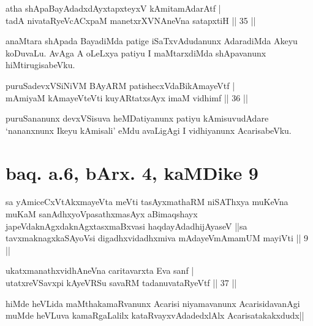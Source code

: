 \begin{shl}
atha shApaBayAdadxdAyxtapxteyxV kAmitamAdarAtf | \\
tadA nivataRyeVcACxpaM manetxrXVNAneVna satapxtiH \hfill|| 35 || 
\end{shl}

\begin{artha}
anaMtara shApada BayadiMda patige iSaTxvAdudanunx AdaradiMda Akeyu 
koDuvaLu. AvAga A oLeLxya patiyu I maMtarxdiMda shApavanunx 
hiMtirugisabeVku.
\end{artha}


\begin{shl}
puruSadevxVSiNiVM BAyARM patishecxVdaBikAmayeVtf | \\
mAmiyaM kAmayeVteVti kuyARtatxsAyx imaM vidhimf \hfill|| 36 || 
\end{shl}

\begin{artha}
puruSananunx devxVSisuva heMDatiyanunx patiyu kAmisuvudAdare 
`nananxnunx Ikeyu kAmisali' eMdu avaLigAgi I vidhiyanunx AcarisabeVku.
\end{artha}

\section*{baq. a.6, bArx. 4, kaMDike 9}

\begin{shl}
sa yAmiceCxVtAkxmayeVta meVti tasAyxmathaRM niSAThxya muKeVna muKaM sanAdhxyoVpasathxmasAyx aBimaqshayx japeVdaknAgxdaknAgxtasxmaBxvasi haqdayAdadhijAyaseV ||sa tavxmaknagxkaSAyoV\s si digadhxvidadhxmiva mAdayeVmAmamUM mayiVti || 9 ||
\end{shl}


\begin{shl}
ukatxmanathxvidhAneVna  caritavarxta Eva sanf | \\
utatxreVSavxpi kAyeVRSu savaRM tadanuvataRyeVtf \hfill|| 37 || 
\end{shl}

\begin{artha}
hiMde heVLida maMthakamaRvanunx Acarisi niyamavanunx AcarisidavanAgi 
muMde heVLuva kamaRgaLalilx kataRvayxvAdadedxlAlx Acarisatakakxdudx||
\end{artha}

